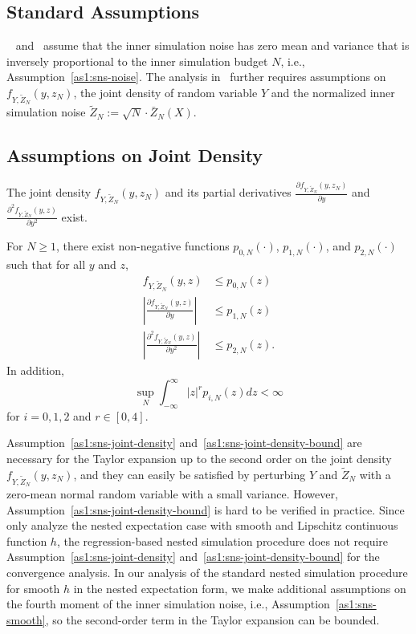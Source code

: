 \subsection{Standard Assumptions}
~\cite{gordy2010nested} and~\cite{broadie2015risk} assume that the inner simulation noise has zero mean and variance that is inversely proportional to the inner simulation budget $N$, i.e., Assumption~\ref{as1:sns-noise}.
The analysis in~\cite{gordy2010nested} further requires assumptions on $f_{Y,\tilde{Z}_N}(y,z_N)$, the joint density of random variable $Y$ and the normalized inner simulation noise $\tilde{Z}_N := \sqrt{N} \cdot\bar{Z}_N(X)$.

\subsection{Assumptions on Joint Density}

\begin{assumption} \label{as1:sns-joint-density}
    The joint density $f_{Y,\tilde{Z}_N}(y,z_N)$ and its partial derivatives 
    $\frac{\partial f_{Y,\tilde{Z}_N}(y,z_N)}{\partial y}$ and $\frac{\partial^2 f_{Y,\tilde{Z}_N}(y,z)}{\partial y^2}$ exist.
\end{assumption}

\begin{assumption} \label{as1:sns-joint-density-bound}
    For $N \geq 1$, there exist non-negative functions $p_{0, N}(\cdot)$, $p_{1, N}(\cdot)$, and $p_{2, N}(\cdot)$ such that for all $y$ and $z$,
    \begin{align*}
        f_{Y,\tilde{Z}_N}(y,z) & \leq p_{0, N}(z) \\
        \left| \frac{\partial f_{Y,\tilde{Z}_N}(y,z)}{\partial y} \right| & \leq p_{1, N}(z) \\
        \left| \frac{\partial^2 f_{Y,\tilde{Z}_N}(y,z)}{\partial y^2} \right| & \leq p_{2, N}(z).
    \end{align*}
    In addition, 
    \begin{equation}
        \sup_N \int_{-\infty}^{\infty} |z|^r p_{i, N}(z) dz < \infty
    \end{equation}
    for $i = 0, 1, 2$ and $r \in [0, 4]$.
\end{assumption}

Assumption~\ref{as1:sns-joint-density} and~\ref{as1:sns-joint-density-bound} are necessary for the Taylor expansion up to the second order on the joint density $f_{Y,\tilde{Z}_N}(y,z_N)$, and they can easily be satisfied by perturbing $Y$ and $\tilde{Z}_N$ with a zero-mean normal random variable with a small variance.
However, Assumption~\ref{as1:sns-joint-density-bound} is hard to be verified in practice.
Since~\cite{broadie2015risk} only analyze the nested expectation case with smooth and Lipschitz continuous function $h$, the regression-based nested simulation procedure does not require Assumption~\ref{as1:sns-joint-density} and~\ref{as1:sns-joint-density-bound} for the convergence analysis.
In our analysis of the standard nested simulation procedure for smooth $h$ in the nested expectation form, we make additional assumptions on the fourth moment of the inner simulation noise, i.e., Assumption~\ref{as1:sns-smooth}, so the second-order term in the Taylor expansion can be bounded. 

